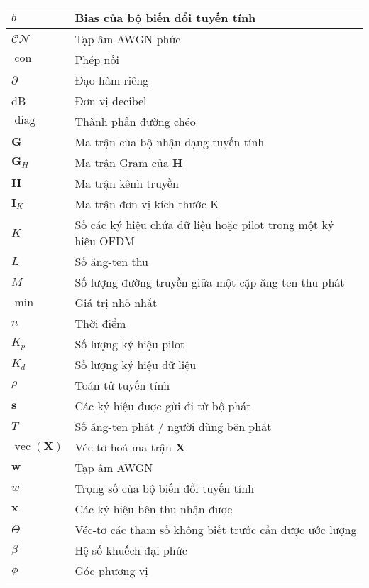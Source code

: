 {{\begin{longtable}{|>{\raggedright}p{4.4cm}|p{10.4cm}|}
\hline
$b$ & Bias của bộ biến đổi tuyến tính \\ 
\hline
$\mathcal{CN}$ & Tạp âm AWGN phức \\ 
\hline
$\operatorname{con}$ & Phép nối \\ 
\hline
$\partial$ & Đạo hàm riêng \\ 
\hline
dB & Đơn vị decibel \\ 
\hline
$\operatorname{diag}$ & Thành phần đường chéo \\ 
\hline
$\mathbf{G}$ & Ma trận của bộ nhận dạng tuyến tính \\ 
\hline
$\mathbf{G}_H$ & Ma trận Gram của $\mathbf{H}$ \\ 
\hline
$\mathbf{H}$ & Ma trận kênh truyền \\ 
\hline
$\mathbf{I}_K$ & Ma trận đơn vị kích thước K \\ 
\hline
$K$ & Số các ký hiệu chứa dữ liệu hoặc pilot trong một ký hiệu OFDM \\ 
\hline
$L$ & Số ăng-ten thu \\ 
\hline
$M$ & Số lượng đường truyền giữa một cặp ăng-ten thu phát \\ 
\hline
$\operatorname{min}$ & Giá trị nhỏ nhất \\ 
\hline
$n$ & Thời điểm \\ 
\hline
$K_p$ & Số lượng ký hiệu pilot \\ 
\hline
$K_d$ & Số lượng ký hiệu dữ liệu \\ 
\hline
$\rho$ & Toán tử tuyến tính \\ 
\hline
$\mathbf{s}$ & Các ký hiệu được gửi đi từ bộ phát \\ 
\hline
$T$ & Số ăng-ten phát / người dùng bên phát \\ 
\hline
$\operatorname{vec}(\mathbf{X})$ & Véc-tơ hoá ma trận $\mathbf{X}$ \\ 
\hline
$\mathbf{w}$ & Tạp âm AWGN \\ 
\hline
$w$ & Trọng số của bộ biến đổi tuyến tính \\ 
\hline
$\mathbf{x}$ & Các ký hiệu bên thu nhận được \\ 
\hline
$\Theta$ & Véc-tơ các tham số không biết trước cần được ước lượng \\ 
\hline
$\beta$ & Hệ số khuếch đại phức \\ 
\hline
$\phi$ & Góc phương vị \\
\hline
\end{longtable}
}}
\newpage

